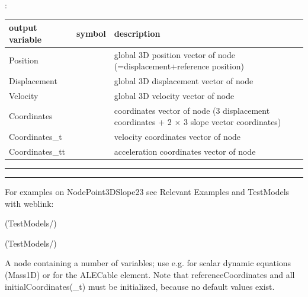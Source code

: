 :
\begin{center}
\footnotesize
\begin{longtable}{| p{5cm} | p{5cm} | p{6cm} |} 
\hline
\bf output variable & \bf symbol & \bf description \\ \hline
Position &  & global 3D position vector of node (=displacement+reference position)\\ \hline
Displacement &  & global 3D displacement vector of node\\ \hline
Velocity &  & global 3D velocity vector of node\\ \hline
Coordinates &  & coordinates vector of node (3 displacement coordinates + 2 $\times$ 3 slope vector coordinates)\\ \hline
Coordinates\_t &  & velocity coordinates vector of node\\ \hline
Coordinates\_tt &  & acceleration coordinates vector of node\\ \hline
\end{longtable}
\end{center}
\par\noindent\rule{\textwidth}{0.4pt}
\label{description_NodePoint3DSlope23}
\vspace{6pt}\par\noindent\rule{\textwidth}{0.4pt}
%
\noindent For examples on NodePoint3DSlope23 see Relevant Examples and TestModels with weblink:
\bi
\item {} (TestModels/)
\item {} (TestModels/)

\ei

%
\newpage


\label{sec:item:NodeGenericODE2}
A node containing a number of  variables; use e.g. for scalar dynamic equations (Mass1D) or for the ALECable element. Note that referenceCoordinates and all initialCoordinates(\_t) must be initialized, because no default values exist.
\vspace{12pt}\\

